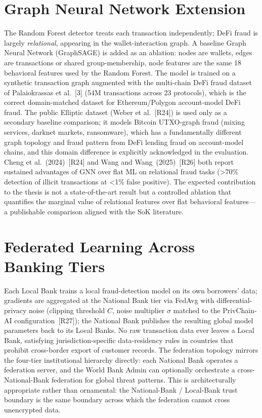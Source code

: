 \documentclass[12pt,a4paper]{report}
\begin{document}
\section{Graph Neural Network Extension}
\label{sec:gnn-extension}

The Random Forest detector treats each transaction independently; DeFi fraud is largely \emph{relational}, appearing in the wallet-interaction graph. A baseline Graph Neural Network (GraphSAGE) is added as an ablation: nodes are wallets, edges are transactions or shared group-membership, node features are the same 18 behavioral features used by the Random Forest. The model is trained on a synthetic transaction graph augmented with the multi-chain DeFi fraud dataset of Palaiokrassas et al.~[3] (54M transactions across 23 protocols), which is the correct domain-matched dataset for Ethereum/Polygon account-model DeFi fraud. The public Elliptic dataset (Weber et al.~[R24]) is used only as a secondary baseline comparison; it models Bitcoin UTXO-graph fraud (mixing services, darknet markets, ransomware), which has a fundamentally different graph topology and fraud pattern from DeFi lending fraud on account-model chains, and this domain difference is explicitly acknowledged in the evaluation. Cheng et al.~(2024)~[R24] and Wang and Wang~(2025)~[R26] both report sustained advantages of GNN over flat ML on relational fraud tasks (>70\% detection of illicit transactions at <1\% false positive). The expected contribution to the thesis is not a state-of-the-art result but a controlled ablation that quantifies the marginal value of relational features over flat behavioral features---a publishable comparison aligned with the SoK literature.

\section{Federated Learning Across Banking Tiers}
\label{sec:fl-fraud}

Each Local Bank trains a local fraud-detection model on its own borrowers' data; gradients are aggregated at the National Bank tier via FedAvg with differential-privacy noise (clipping threshold $C$, noise multiplier $\sigma$ matched to the PrivChain-AI configuration~[R27]); the National Bank publishes the resulting global model parameters back to its Local Banks. No raw transaction data ever leaves a Local Bank, satisfying jurisdiction-specific data-residency rules in countries that prohibit cross-border export of customer records. The federation topology mirrors the four-tier institutional hierarchy directly: each National Bank operates a federation server, and the World Bank Admin can optionally orchestrate a cross-National-Bank federation for global threat patterns. This is architecturally appropriate rather than ornamental: the National-Bank / Local-Bank trust boundary is the same boundary across which the federation cannot cross unencrypted data.
\end{document}
